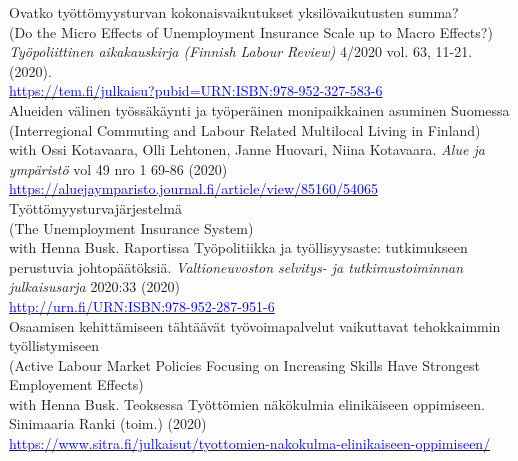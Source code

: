\documentclass[16pt]{article}
\begin{document}
\noindent Ovatko ty\"{o}tt\"{o}myysturvan kokonaisvaikutukset yksil\"{o}vaikutusten summa? \\
\noindent (Do the Micro Effects of Unemployment Insurance Scale up to Macro Effects?) \\
\noindent  \textit{Ty\"{o}poliittinen aikakauskirja (Finnish Labour Review)} 4/2020 vol. 63, 11-21.  (2020). \\
\noindent  \href{https://tem.fi/julkaisu?pubid=URN:ISBN:978-952-327-583-6} {\textcolor{blue}{https://tem.fi/julkaisu?pubid=URN:ISBN:978-952-327-583-6}}\\

\noindent Alueiden v\"{a}linen ty\"{o}ss\"{a}k\"{a}ynti ja ty\"{o}per\"{a}inen monipaikkainen asuminen Suomessa \\
\noindent (Interregional Commuting and Labour Related Multilocal Living in Finland) \\
\noindent with Ossi Kotavaara, Olli Lehtonen, Janne Huovari, Niina Kotavaara. \textit{Alue ja ympäristö} vol 49 nro 1 69-86 (2020) \\
\noindent  \href{https://aluejaymparisto.journal.fi/article/view/85160/54065}{\textcolor{blue}{https://aluejaymparisto.journal.fi/article/view/85160/54065}} \\
 
\noindent Ty\"{o}tt\"{o}myysturvaj\"{a}rjestelm\"{a} \\
\noindent (The Unemployment Insurance System) \\
\noindent with Henna Busk. Raportissa Ty\"{o}politiikka ja ty\"{o}llisyysaste: tutkimukseen perustuvia johtop\"{a}\"{a}t\"{o}ksi\"{a}. \textit{Valtioneuvoston selvitys- ja tutkimustoiminnan julkaisusarja} 2020:33 (2020) \\
\noindent  \href{http://urn.fi/URN:ISBN:978-952-287-951-6}{\textcolor{blue}{http://urn.fi/URN:ISBN:978-952-287-951-6}} \\

\noindent Osaamisen kehitt\"{a}miseen t\"{a}ht\"{a}\"{a}v\"{a}t ty\"{o}voimapalvelut vaikuttavat tehokkaimmin ty\"{o}llistymiseen \\
\noindent (Active Labour Market Policies Focusing on Increasing Skills Have Strongest Employement Effects) \\
\noindent with Henna Busk. Teoksessa Työttömien näkökulmia elinikäiseen oppimiseen. Sinimaaria Ranki (toim.) (2020)  \\
\noindent  \href{https://www.sitra.fi/julkaisut/tyottomien-nakokulma-elinikaiseen-oppimiseen/}{\textcolor{blue}{https://www.sitra.fi/julkaisut/tyottomien-nakokulma-elinikaiseen-oppimiseen/}} \\
\end{document}

